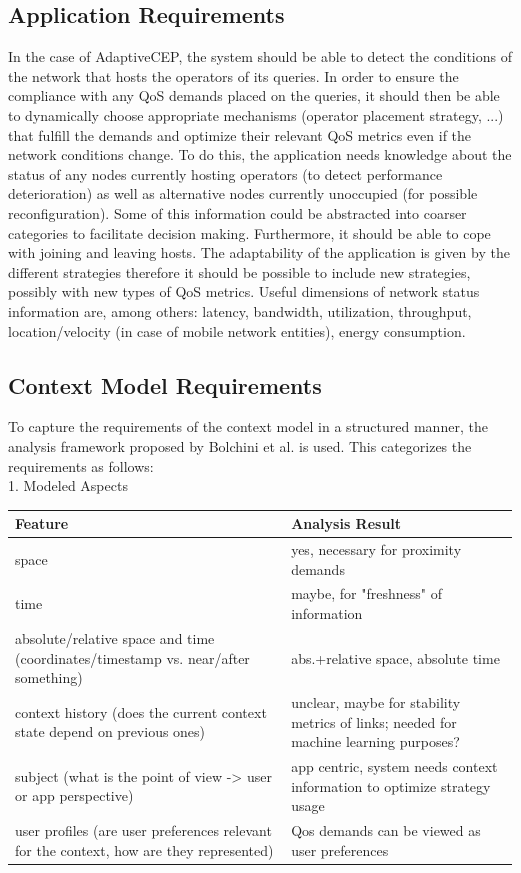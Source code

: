 \subsection{Application Requirements}
In the case of AdaptiveCEP, the system should be able to detect the conditions of the network that hosts the operators of its queries. In order to ensure the compliance with any QoS demands placed on the queries, it should then be able to dynamically choose appropriate mechanisms (operator placement strategy, ...) that fulfill the demands and optimize their relevant QoS metrics even if the network conditions change. 
To do this, the application needs knowledge about the status of any nodes currently hosting operators (to detect performance deterioration) as well as alternative nodes currently unoccupied (for possible reconfiguration).
Some of this information could be abstracted into coarser categories to facilitate decision making.
Furthermore, it should be able to cope with joining and leaving hosts. 
The adaptability of the application is given by the different strategies therefore it should be possible to include new strategies, possibly with new types of QoS metrics. Useful dimensions of network status information are, among others: latency, bandwidth, utilization, throughput, location/velocity (in case of mobile network entities), energy consumption.

\subsection{Context Model Requirements}
To capture the requirements of the context model in a structured manner, the analysis framework proposed by Bolchini et al. is used. This categorizes the requirements as follows: \\
1. Modeled Aspects \\
\newline
\begin{tabularx}{\textwidth}{|X|X|}
\hline
\textbf{Feature} & \textbf{Analysis Result} \\
\hline 
space & yes, necessary for proximity demands \\ 
\hline 
time & maybe, for "freshness" of information \\ 
\hline 
absolute/relative space and time (coordinates/timestamp vs. near/after something)  & abs.+relative space, absolute time \\ 
\hline 
context history (does the current context state depend on previous ones)  & unclear, maybe for stability metrics of links; needed for machine learning purposes? \\ 
\hline 
subject (what is the point of view -> user or app perspective) & app centric, system needs context information to optimize strategy usage \\ 
\hline 
user profiles (are user preferences relevant for the context, how are they represented) & Qos demands can be viewed as user preferences \\ 
\hline 
\end{tabularx} 


